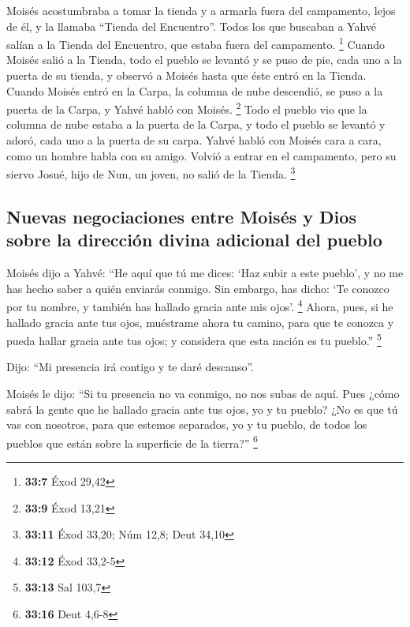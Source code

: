 \begin{paracol}{2}
 Moisés acostumbraba a tomar la tienda y a armarla fuera
del campamento, lejos de él, y la llamaba ``Tienda del Encuentro''.
Todos los que buscaban a Yahvé salían a la Tienda del Encuentro, que
estaba fuera del campamento. \footnote{\textbf{33:7} Éxod 29,42}
 Cuando Moisés salió a la Tienda, todo el pueblo se
levantó y se puso de pie, cada uno a la puerta de su tienda, y observó a
Moisés hasta que éste entró en la Tienda.  Cuando Moisés
entró en la Carpa, la columna de nube descendió, se puso a la puerta de
la Carpa, y Yahvé habló con Moisés. \footnote{\textbf{33:9} Éxod 13,21}
 Todo el pueblo vio que la columna de nube estaba a la
puerta de la Carpa, y todo el pueblo se levantó y adoró, cada uno a la
puerta de su carpa.  Yahvé habló con Moisés cara a cara,
como un hombre habla con su amigo. Volvió a entrar en el campamento,
pero su siervo Josué, hijo de Nun, un joven, no salió de la Tienda.
\footnote{\textbf{33:11} Éxod 33,20; Núm 12,8; Deut 34,10}

\hypertarget{nuevas-negociaciones-entre-moisuxe9s-y-dios-sobre-la-direcciuxf3n-divina-adicional-del-pueblo}{%
\subsection{Nuevas negociaciones entre Moisés y Dios sobre la dirección
divina adicional del
pueblo}\label{nuevas-negociaciones-entre-moisuxe9s-y-dios-sobre-la-direcciuxf3n-divina-adicional-del-pueblo}}

 Moisés dijo a Yahvé: ``He aquí que tú me dices: `Haz
subir a este pueblo', y no me has hecho saber a quién enviarás conmigo.
Sin embargo, has dicho: `Te conozco por tu nombre, y también has hallado
gracia ante mis ojos'. \footnote{\textbf{33:12} Éxod 33,2-5}
 Ahora, pues, si he hallado gracia ante tus ojos,
muéstrame ahora tu camino, para que te conozca y pueda hallar gracia
ante tus ojos; y considera que esta nación es tu pueblo.'' \footnote{\textbf{33:13}
  Sal 103,7}

 Dijo: ``Mi presencia irá contigo y te daré descanso''.

 Moisés le dijo: ``Si tu presencia no va conmigo, no nos
subas de aquí.  Pues ¿cómo sabrá la gente que he hallado
gracia ante tus ojos, yo y tu pueblo? ¿No es que tú vas con nosotros,
para que estemos separados, yo y tu pueblo, de todos los pueblos que
están sobre la superficie de la tierra?'' \footnote{\textbf{33:16} Deut
  4,6-8}


\end{paracol}
